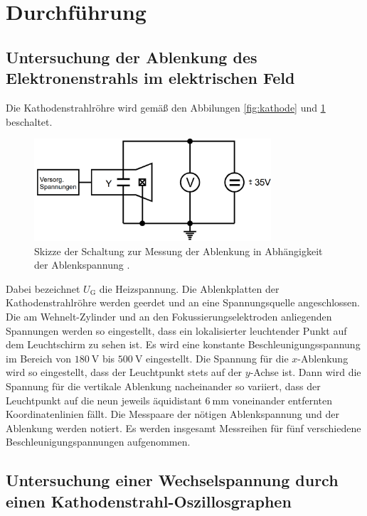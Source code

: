 \section{Durchführung}
\label{sec:Durchführung}
\subsection{Untersuchung der Ablenkung des Elektronenstrahls im elektrischen Feld}
\label{subsec:ablenkung1}
Die Kathodenstrahlröhre wird gemäß den Abbilungen \ref{fig:kathode} und \ref{fig:schaltung1} beschaltet.

\begin{figure}[H]
  \centering
  \includegraphics[width=250pt]{data/schaltung1.png}
  \caption{Skizze der Schaltung zur Messung der Ablenkung in Abhängigkeit der Ablenkspannung \cite{Versuchsanleitung501}.}
  \label{fig:schaltung1}
\end{figure}

Dabei bezeichnet
$U_\text{G}$ die Heizspannung. Die Ablenkplatten der Kathodenstrahlröhre werden
geerdet und an eine Spannungsquelle angeschlossen. Die am Wehnelt-Zylinder und
an den Fokussierungselektroden anliegenden Spannungen werden so eingestellt, dass
ein lokalisierter leuchtender Punkt auf dem Leuchtschirm zu sehen ist. Es wird eine
konstante Beschleunigungsspannung im Bereich von $\SI{180}{\volt}$ bis $\SI{500}{\volt}$
eingestellt. Die Spannung für die $x$-Ablenkung wird so eingestellt, dass der Leuchtpunkt
stets auf der $y$-Achse ist. Dann wird die Spannung für die vertikale Ablenkung nacheinander so
variiert, dass der Leuchtpunkt auf die neun jeweils äquidistant $\SI{6}{\milli\meter}$
voneinander entfernten Koordinatenlinien fällt. Die Messpaare der nötigen Ablenkspannung
und der Ablenkung werden notiert. Es werden insgesamt Messreihen für fünf verschiedene
Beschleunigungspannungen aufgenommen.

\subsection{Untersuchung einer Wechselspannung durch einen Kathodenstrahl-Oszillosgraphen}
\label{subsec:oszi}

